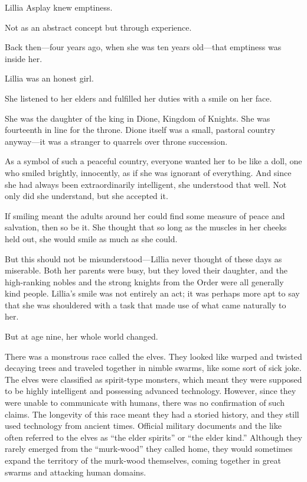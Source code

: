 Lillia Asplay knew emptiness.

Not as an abstract concept but through experience.

Back then—four years ago, when she was ten years old—that emptiness was inside her.

\icon

Lillia was an honest girl.

She listened to her elders and fulfilled her duties with a smile on her face.

She was the daughter of the king in Dione, Kingdom of Knights. She was fourteenth in line for the throne. Dione itself was a small, pastoral country anyway—it was a stranger to quarrels over throne succession.

As a symbol of such a peaceful country, everyone wanted her to be like a doll, one who smiled brightly, innocently, as if she was ignorant of everything. And since she had always been extraordinarily intelligent, she understood that well. Not only did she understand, but she accepted it.

If smiling meant the adults around her could find some measure of peace and salvation, then so be it. She thought that so long as the muscles in her cheeks held out, she would smile as much as she could.

But this should not be misunderstood—Lillia never thought of these days as miserable. Both her parents were busy, but they loved their daughter, and the high-ranking nobles and the strong knights from the Order were all generally kind people. Lillia’s smile was not entirely an act; it was perhaps more apt to say that she was shouldered with a task that made use of what came naturally to her.

But at age nine, her whole world changed.

There was a monstrous race called the elves. They looked like warped and twisted decaying trees and traveled together in nimble swarms, like some sort of sick joke. The elves were classified as spirit-type monsters, which meant they were supposed to be highly intelligent and possessing advanced technology. However, since they were unable to communicate with humans, there was no confirmation of such claims. The longevity of this race meant they had a storied history, and they still used technology from ancient times. Official military documents and the like often referred to the elves as “the elder spirits” or “the elder kind.” Although they rarely emerged from the “murk-wood” they called home, they would sometimes expand the territory of the murk-wood themselves, coming together in great swarms and attacking human domains.

